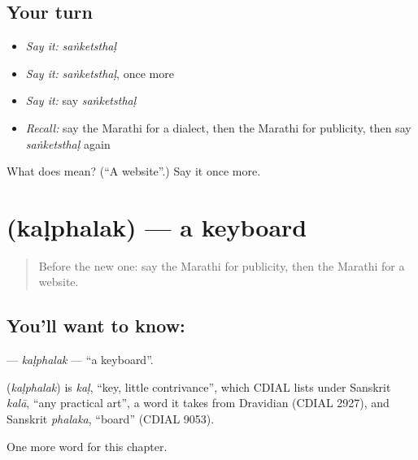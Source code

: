 \subsection*{Your turn}
\begin{itemize}
\raggedright
  \item \emph{Say it:} \emph{saṅketsthaḷ}
  \item \emph{Say it:} \emph{saṅketsthaḷ}, once more
  \item \emph{Say it:} say \emph{saṅketsthaḷ}
  \item \emph{Recall:} say the Marathi for a dialect, then the Marathi for publicity, then say \emph{saṅketsthaḷ} again
\end{itemize}

\begin{tcolorbox}[breakable,colback=teal!4,colframe=teal!35!black,title={Before you move on}]
What does  mean? (\textquotedblleft{}A website\textquotedblright{}.) Say it once more.
\end{tcolorbox}
\section[\texorpdfstring{\mr{कळफलक} (kaḷphalak)}{कळफलक (kaḷphalak)}]{ (kaḷphalak) — a keyboard}

\label{lesson:MR-C237-kalphalak}



\begin{quote}
Before the new one: say the Marathi for publicity, then the Marathi for a website.
\end{quote}

\subsection*{You'll want to know: }
\textbf{} — \emph{kaḷphalak} — \textquotedblleft{}a keyboard\textquotedblright{}.

\begin{cousinweb}
\textbf{} (\emph{kaḷphalak}) is \emph{kaḷ}, \textquotedblleft{}key, little contrivance\textquotedblright{}, which CDIAL lists under Sanskrit \emph{kalā}, \textquotedblleft{}any practical art\textquotedblright{}, a word it takes from Dravidian (CDIAL 2927), and Sanskrit \emph{phalaka}, \textquotedblleft{}board\textquotedblright{} (CDIAL 9053).
\end{cousinweb}

\begin{grammarlens}[title={What you've built}]
One more word for this chapter.
\end{grammarlens}

